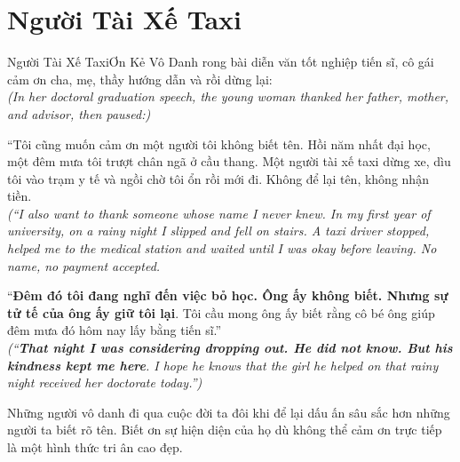 \section{Người Tài Xế Taxi}
\begin{truyen}{Người Tài Xế Taxi}{Ơn Kẻ Vô Danh}
rong bài diễn văn tốt nghiệp tiến sĩ, cô gái cảm ơn cha, mẹ, thầy hướng dẫn và rồi dừng lại:\\
\textit{(In her doctoral graduation speech, the young woman thanked her father, mother, and advisor, then paused:)}

``Tôi cũng muốn cảm ơn một người tôi không biết tên. Hồi năm nhất đại học, một đêm mưa tôi trượt chân ngã ở cầu thang. Một người tài xế taxi dừng xe, dìu tôi vào trạm y tế và ngồi chờ tôi ổn rồi mới đi. Không để lại tên, không nhận tiền.\\
\textit{(``I also want to thank someone whose name I never knew. In my first year of university, on a rainy night I slipped and fell on stairs. A taxi driver stopped, helped me to the medical station and waited until I was okay before leaving. No name, no payment accepted.}

``\textbf{Đêm đó tôi đang nghĩ đến việc bỏ học. Ông ấy không biết. Nhưng sự tử tế của ông ấy giữ tôi lại}. Tôi cầu mong ông ấy biết rằng cô bé ông giúp đêm mưa đó hôm nay lấy bằng tiến sĩ.''\\
\textit{(``\textbf{That night I was considering dropping out. He did not know. But his kindness kept me here}. I hope he knows that the girl he helped on that rainy night received her doctorate today.'')}
\end{truyen}
\begin{baihoc}
  Những người vô danh đi qua cuộc đời ta đôi khi để lại dấu ấn sâu sắc hơn những người ta biết rõ tên. Biết ơn sự hiện diện của họ dù không thể cảm ơn trực tiếp là một hình thức tri ân cao đẹp.
\end{baihoc}

